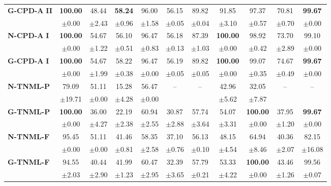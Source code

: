 \begin{table}[ht]
\begin{tabular}{lcccccccccc}
\midrule
\textbf{G-CPD-A} \textbf{II} & \textbf{100.00} & 48.44 & \textbf{58.24} & 96.00 & 56.15 & 89.82 & 91.85 & 97.37 & 70.81 & \textbf{99.67} \\
 & $\pm$0.00 & $\pm$2.43 & $\pm$0.96 & $\pm$1.58 & $\pm$0.05 & $\pm$0.04 & $\pm$3.10 & $\pm$0.57 & $\pm$0.70 & $\pm$0.00 \\
\midrule
\textbf{N-CPD-A} \textbf{I} & \textbf{100.00} & 54.67 & 56.10 & 96.47 & 56.18 & 87.39 & \textbf{100.00} & 98.92 & 73.70 & 99.10 \\
 & $\pm$0.00 & $\pm$1.22 & $\pm$0.51 & $\pm$0.83 & $\pm$0.13 & $\pm$1.03 & $\pm$0.00 & $\pm$0.42 & $\pm$2.89 & $\pm$0.00 \\
\midrule
\textbf{G-CPD-A} \textbf{I} & \textbf{100.00} & 54.67 & 58.22 & 96.47 & 56.19 & 89.82 & \textbf{100.00} & 99.07 & 74.67 & \textbf{99.67} \\
 & $\pm$0.00 & $\pm$1.99 & $\pm$0.38 & $\pm$0.00 & $\pm$0.05 & $\pm$0.05 & $\pm$0.00 & $\pm$0.35 & $\pm$0.49 & $\pm$0.00 \\
\midrule
\midrule
\textbf{N-TNML-P} & 79.09 & 51.11 & 15.28 & 56.47 & -- & -- & 42.96 & 32.05 & -- & -- \\
 & $\pm$19.71 & $\pm$0.00 & $\pm$4.28 & $\pm$0.00 &  &  & $\pm$5.62 & $\pm$7.87 &  &  \\
\midrule
\textbf{G-TNML-P} & \textbf{100.00} & 36.00 & 22.19 & 60.94 & 30.87 & 57.74 & 54.07 & \textbf{100.00} & 37.95 & \textbf{99.67} \\
 & $\pm$0.00 & $\pm$4.27 & $\pm$2.38 & $\pm$2.55 & $\pm$2.88 & $\pm$3.64 & $\pm$3.31 & $\pm$0.00 & $\pm$1.20 & $\pm$0.00 \\
\midrule
\textbf{N-TNML-F} & 95.45 & 51.11 & 41.46 & 58.35 & 37.10 & 56.13 & 48.15 & 64.94 & 40.36 & 82.15 \\
 & $\pm$0.00 & $\pm$0.00 & $\pm$0.81 & $\pm$2.58 & $\pm$0.76 & $\pm$0.10 & $\pm$4.54 & $\pm$8.46 & $\pm$2.07 & $\pm$16.08 \\
\midrule
\textbf{G-TNML-F} & 94.55 & 40.44 & 41.99 & 60.47 & 32.39 & 57.79 & 53.33 & \textbf{100.00} & 43.46 & 99.56 \\
 & $\pm$2.03 & $\pm$2.90 & $\pm$1.23 & $\pm$2.95 & $\pm$3.65 & $\pm$0.21 & $\pm$4.22 & $\pm$0.00 & $\pm$1.26 & $\pm$0.07 \\
\bottomrule
\end{tabular}
\end{table}